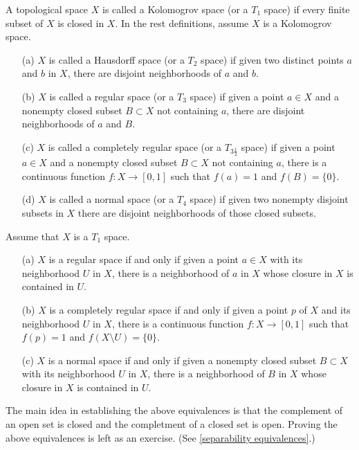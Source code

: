 \begin{defi}
    A topological space $X$ is called a Kolomogrov space (or a $T_1$ space) if every finite subset of $X$ is closed in $X$.
    In the rest definitions, assume $X$ is a Kolomogrov space.
    \begin{enumerate}
        \item[(a)]
        {
            $X$ is called a Hausdorff space (or a $T_2$ space) if given two distinct points $a$ and $b$ in $X$, there are disjoint neighborhoods of $a$ and $b$.
        }
        \item[(b)]
        {
            $X$ is called a regular space (or a $T_3$ space) if given a point $a\in X$ and a nonempty closed subset $B\subset X$ not containing $a$, there are disjoint neighborhoods of $a$ and $B$.
        }
        \item[(c)]
        {
            $X$ is called a completely regular space (or a $T_{3\frac{1}{2}}$ space) if given a point $a\in X$ and a nonempty closed subset $B\subset X$ not containing $a$, there is a continuous function $f: X\rightarrow[0, 1]$ such that $f(a)=1$ and $f(B)=\{0\}$.
        }
        \item[(d)]
        {
            $X$ is called a normal space (or a $T_4$ space) if given two nonempty disjoint subsets in $X$ there are disjoint neighborhoods of those closed subsets.
        }
    \end{enumerate}
\end{defi}
\begin{rmk}
    Assume that $X$ is a $T_1$ space.
    \begin{enumerate}
        \item[(a)]
        {
            $X$ is a regular space if and only if given a point $a\in X$ with its neighborhood $U$ in $X$, there is a neighborhood of $a$ in $X$ whose closure in $X$ is contained in $U$.
        }
        \item[(b)]
        {
            $X$ is a completely regular space if and only if given a point $p$ of $X$ and its neighborhood $U$ in $X$, there is a continuous function $f: X\rightarrow[0, 1]$ such that $f(p)=1$ and $f(X\setminus U)=\{0\}$.
        }
        \item[(c)]
        {
            $X$ is a normal space if and only if given a nonempty closed subset $B\subset X$ with its neighborhood $U$ in $X$, there is a neighborhood of $B$ in $X$ whose closure in $X$ is contained in $U$.
        }
    \end{enumerate}
    The main idea in establishing the above equivalences is that the complement of an open set is closed and the completment of a closed set is open.
    \color{brown}Proving the above equivalences is left as an exercise. (See \cref{separability equivalences}.)\color{black}
\end{rmk}

